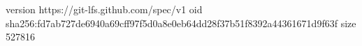 version https://git-lfs.github.com/spec/v1
oid sha256:fd7ab727de6940a69cff97f5d0a8e0eb64dd28f37b51f8392a44361671d9f63f
size 527816
